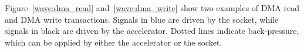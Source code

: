 Figure~\ref{wave:dma_read} and~\ref{wave:dma_write} show two examples of DMA
read and DMA write transactions. Signals in blue are driven by the socket, while
signals in black are driven by the accelerator. Dotted lines indicate
back-pressure, which can be applied by either the accelerator or the socket.

